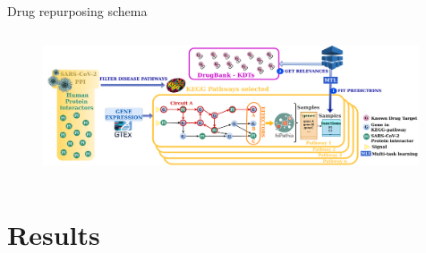 \documentclass[compress,ignorenonframetext,aspectratio=1610,handout]{beamer}
\begin{document}
\begin{frame}{Drug repurposing schema}
	\begin{columns}
		\begin{figure}
			\includegraphics[width=0.99\textwidth]{figs/methods/COVI-19_drugRepo.png}
		\end{figure}

	\end{columns}
\end{frame}


\section{Results}
\end{document}
